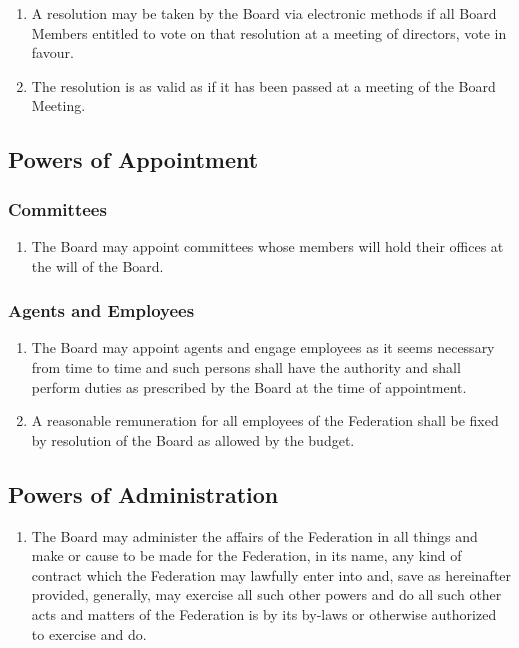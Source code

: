 \begin{enumerate}
 \item
  A resolution may be taken by the Board via electronic methods if all Board Members entitled to vote on that resolution at a meeting of directors, vote in favour.
 \item
  The resolution is as valid as if it has been passed at a meeting of the Board Meeting.
\end{enumerate}

\subsection{Powers of Appointment}
\label{powers-of-appointment}

\subsubsection{Committees}
\label{committees}

\begin{enumerate}
 \item
  The Board may appoint committees whose members will hold their offices at the will of the Board.
\end{enumerate}

\subsubsection{Agents and Employees}
\label{agents-and-employees}

\begin{enumerate}
 \item
  The Board may appoint agents and engage employees as it seems necessary from time to time and such persons shall have the authority and shall perform duties as prescribed by the Board at the time of appointment.
 \item
  A reasonable remuneration for all employees of the Federation shall be fixed by resolution of the Board as allowed by the budget.
\end{enumerate}

\subsection{Powers of Administration}
\label{powers-of-administration}

\begin{enumerate}
 \item
  The Board may administer the affairs of the Federation in all things and make or cause to be made for the Federation, in its name, any kind of contract which the Federation may lawfully enter into and, save as hereinafter provided, generally, may exercise all such other powers and do all such other acts and matters of the Federation is by its by-laws or otherwise authorized to exercise and do.
\end{enumerate}

